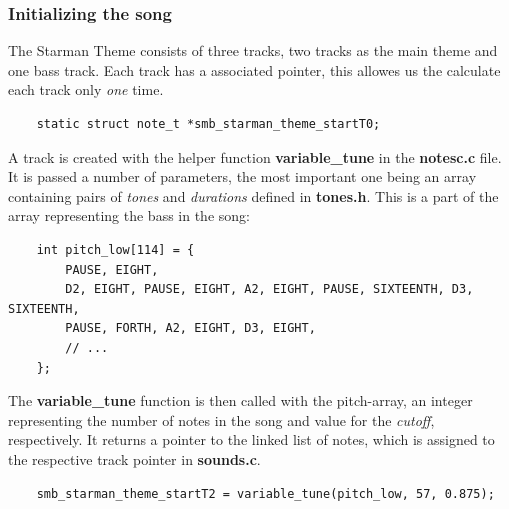 \subsubsection{Initializing the song}
The Starman Theme consists of three tracks, two tracks as the main theme and one bass track. 
Each track has a associated pointer, this allowes us the calculate each track only
\textit{one} time. 
\begin{lstlisting}
	static struct note_t *smb_starman_theme_startT0;
\end{lstlisting}
A track is created with the helper function \textbf{variable\_tune} in the \textbf{notesc.c} file.
It is passed a number of parameters, the most important one being an array containing pairs
of \textit{tones} and \textit{durations} defined in \textbf{tones.h}. This is a part of the array
representing the bass in the song:
\begin{lstlisting}
	int pitch_low[114] = {
		PAUSE, EIGHT,
		D2, EIGHT, PAUSE, EIGHT, A2, EIGHT, PAUSE, SIXTEENTH, D3, SIXTEENTH,
		PAUSE, FORTH, A2, EIGHT, D3, EIGHT,
		// ...
	};
\end{lstlisting}
The \textbf{variable\_tune} function is then called with the pitch-array, an integer representing
the number of notes in the song and value for the \textit{cutoff}, respectively. It returns a pointer to the linked list of notes, which is assigned to the respective track pointer in 
\textbf{sounds.c}.
\begin{lstlisting}
	smb_starman_theme_startT2 = variable_tune(pitch_low, 57, 0.875);
\end{lstlisting}
